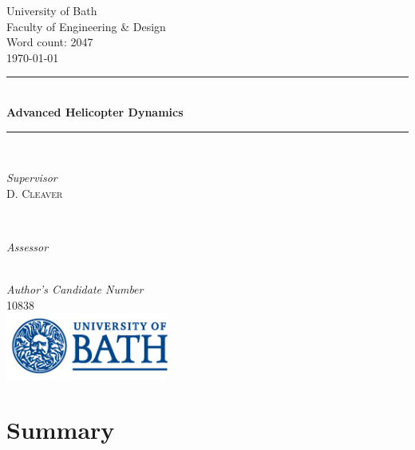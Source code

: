 \documentclass[11pt]{article}
\begin{document}
 

	\begin{titlepage}
	\thispagestyle{empty}
		\newcommand{\HRule}{\rule{\linewidth}{0.5mm}}	
		\center
		\LARGE 
		University of Bath\\
	 	Faculty of Engineering \& Design\\[1cm]	
		\large
		Word count: 2047\\[0.5cm]
		{\large\today}\\[1cm]	
		\HRule\\[0.4cm]	
		{\LARGE \bfseries Advanced Helicopter Dynamics}\\[0.3cm] 	
		\HRule\\[1cm]	
		\begin{minipage}{0.4\textwidth}
			\begin{flushleft}
				\large
				\textit{Supervisor}\\
				D. \textsc{Cleaver}
			\end{flushleft}
		\end{minipage}
		~
		\begin{minipage}{0.4\textwidth}
			\begin{flushright}
				\large
				\textit{Assessor}\\
				
			\end{flushright}
		\end{minipage}\\[1.4cm]
		\large
		\textit{Author's Candidate Number}\\
		10838\\
		\vfill
		\includegraphics[width=0.4\textwidth]{UOB_Logo.png}\\
		\vfill 
	\end{titlepage}




\thispagestyle{empty}


\section*{Summary}
\end{document}
